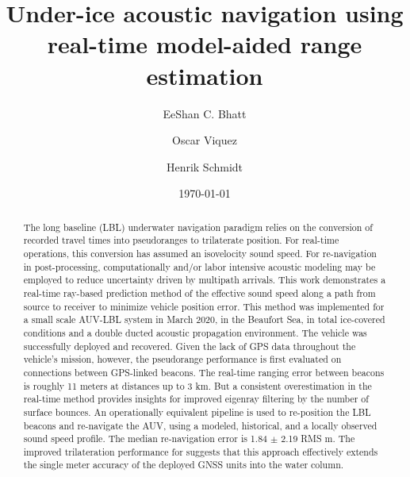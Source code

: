 \title[JASA/draft]{Under-ice acoustic navigation using real-time model-aided range estimation}
\author{EeShan C. Bhatt}
\author{Oscar Viquez}
\author{Henrik Schmidt}



\date{\today}

\begin{abstract}
The long baseline (LBL) underwater navigation paradigm relies on the conversion of recorded travel times into pseudoranges to trilaterate position.
For real-time operations, this conversion has assumed an isovelocity sound speed.
For re-navigation in post-processing, computationally and/or labor intensive acoustic modeling may be employed to reduce uncertainty driven by multipath arrivals.
This work demonstrates a real-time ray-based prediction method of the effective sound speed along a path from source to receiver to minimize vehicle position error.
 This method was implemented for a small scale AUV-LBL system in March 2020, in the Beaufort Sea, in total ice-covered conditions and a double ducted acoustic propagation environment.
The vehicle was successfully deployed and recovered.
 Given the lack of GPS data throughout the vehicle's mission, however, the pseudorange performance is first evaluated on connections between GPS-linked beacons.
The real-time ranging error between beacons is roughly 11 meters at distances up to 3 km.
But a consistent overestimation in the real-time method provides insights for improved eigenray filtering by the number of surface bounces.
An operationally equivalent pipeline is used to re-position the LBL beacons and re-navigate the AUV, using a modeled, historical, and a locally observed sound speed profile.
The median re-navigation error is 1.84 $\pm$ 2.19 RMS m.
The improved trilateration performance for suggests that this approach effectively extends the single meter accuracy of the deployed GNSS units into the water column. 
\end{abstract}

